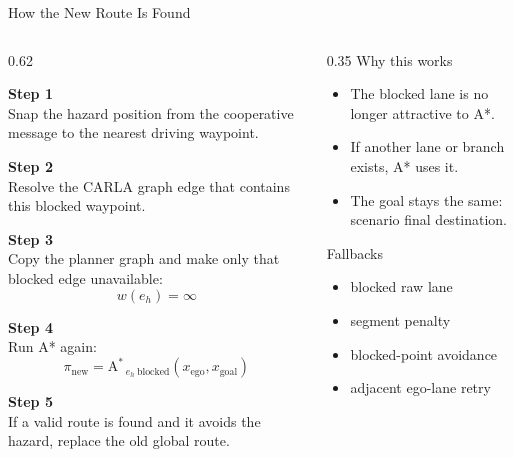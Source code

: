 \documentclass[aspectratio=169]{beamer}
\begin{document}
\begin{frame}{How the New Route Is Found}
\small
\begin{columns}[T,onlytextwidth]
\begin{column}{0.62\textwidth}
\begin{flushleft}
\textbf{Step 1}\\[0.3em]
Snap the hazard position from the cooperative message to the nearest driving waypoint.

\textbf{Step 2}\\[0.3em]
Resolve the CARLA graph edge that contains this blocked waypoint.

\textbf{Step 3}\\[0.3em]
Copy the planner graph and make only that blocked edge unavailable:
\[
w(e_h)=\infty
\]

\textbf{Step 4}\\[0.3em]
Run A* again:
\[
\pi_{\mathrm{new}}
=
\operatorname{A^*}_{\,e_h\ \mathrm{blocked}}
(x_{\mathrm{ego}},x_{\mathrm{goal}})
\]

\textbf{Step 5}\\[0.3em]
If a valid route is found and it avoids the hazard, replace the old global route.
\end{flushleft}
\end{column}

\begin{column}{0.35\textwidth}
Why this works
\begin{itemize}
\setlength\itemsep{0.3em}
\item The blocked lane is no longer attractive to A*.
\item If another lane or branch exists, A* uses it.
\item The goal stays the same: scenario final destination.
\end{itemize}

Fallbacks
\begin{itemize}
\setlength\itemsep{0.3em}
\item blocked raw lane
\item segment penalty
\item blocked-point avoidance
\item adjacent ego-lane retry
\end{itemize}
\end{column}
\end{columns}
\end{frame}
\end{document}
